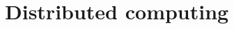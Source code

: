 \documentclass[t,10pt]{beamer}
\begin{document}

\section{Distributed computing}

\newcommand{\iSite}{s}
\newcommand{\nSites}{S}
\newcommand{\doH}{\texttt{[H]}\xspace}
\newcommand{\doS}{\texttt{[S]}\xspace}
\newcommand{\algospace}{\hspace{\algorithmicindent}}
\newcommand{\lsite}{\blk_\times}
\end{document}
